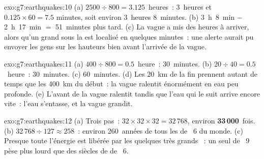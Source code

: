 \begin{solution}{exo:g7:earthquakes:10}
(a) $2500 \div 800 = 3.125$~heures~: 3~heures et $0.125 \times 60 = 7.5$
minutes, soit environ 3~heures 8~minutes. (b) 3~h~8~min $-$ 2~h~17~min $=$
51~minutes plus tard. (c) La vague a mis des heures à arriver, alors qu'un
grand  sous la  est localisé en quelques minutes~: une alerte
aurait pu envoyer les gens sur les hauteurs bien avant l'arrivée de la
vague.
\end{solution}

\begin{solution}{exo:g7:earthquakes:11}
(a) $400 \div 800 = 0.5$~heure~: 30~minutes. (b) $20 \div 40 = 0.5$~heure~:
30~minutes. (c) 60~minutes. (d) Les \qty{20}{km} de la fin prennent autant
de temps que les \qty{400}{km} du début~: la vague ralentit énormément en
eau peu profonde. (e) L'avant de la vague ralentit tandis que l'eau qui le
suit arrive encore vite~: l'eau s'entasse, et la vague grandit.
\end{solution}

\begin{solution}{exo:g7:earthquakes:12}
(a) Trois pas~: $32 \times 32 \times 32 = 32\,768$, environ
\textbf{33\,000}~fois. (b) $32\,768 \div 127 \approx 258$~: environ
260~années de tous les  de ~6 du monde. (c) Presque toute
l'énergie est libérée par les quelques très grands ~: un seul
 de ~9 pèse plus lourd que des siècles de  de
~6.
\end{solution}

